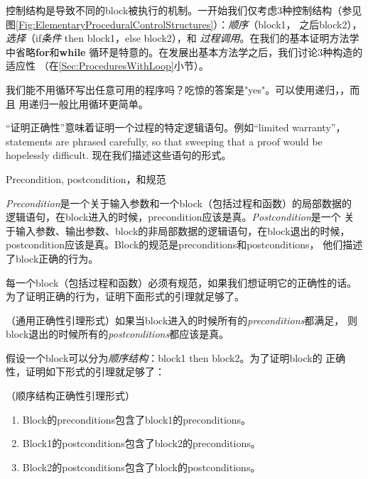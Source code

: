 控制结构是导致不同的block被执行的机制。一开始我们仅考虑3种控制结构（参见
图\ref{Fig:ElementaryProceduralControlStructures}）：\emph{顺序}（block1，
之后block2），\emph{选择}（if\emph{条件} then block1，else block2），和
\emph{过程调用}。在我们的基本证明方法学中省略\textbf{for}和\textbf{while}
循环是特意的。在发展出基本方法学之后，我们讨论3种构造的适应性
（在\ref{Sec:ProceduresWithLoop}小节）。

我们能不用循环写出任意可用的程序吗？吃惊的答案是"yes"。可以使用递归，，而且
用递归一般比用循环更简单。

“证明正确性”意味着证明一个过程的特定逻辑语句。例如“limited warranty”，statements
 are phrased carefully, so that sweeping that a proof would be hopelessly
difficult. 现在我们描述这些语句的形式。

\begin{definition}
Precondition, postcondition，和规范

\emph{Precondition}是一个关于输入参数和一个block（包括过程和函数）的局部数据的
逻辑语句，在block进入的时候，precondition应该是真。\emph{Postcondition}是一个
关于输入参数、输出参数、block的非局部数据的逻辑语句，在block退出的时候，
postcondition应该是真。Block的规范是preconditions和postconditions，
他们描述了block正确的行为。
\end{definition}

每一个block（包括过程和函数）必须有规范，如果我们想证明它的正确性的话。
为了证明正确的行为，证明下面形式的引理就足够了。

\begin{proposition}\label{Proposition:GeneralCorrectnessLemmaForm}
（通用正确性引理形式）如果当block进入的时候所有的\emph{preconditions}都满足，
则block退出的时候所有的\emph{postconditions}都应该是真。
\end{proposition}

假设一个block可以分为\emph{顺序结构}：block1 then block2。为了证明block的
正确性，证明如下形式的引理就足够了：

\begin{proposition}\label{Proposition:SequenceCorrectnessLemmaForm}
（顺序结构正确性引理形式）
\begin{enumerate}
\item Block的preconditions包含了block1的preconditions。
\item Block1的postconditions包含了block2的preconditions。
\item Block2的postconditions包含了block的postconditions。
\end{enumerate}
\end{proposition}

